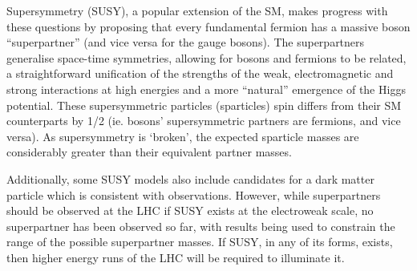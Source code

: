 Supersymmetry (SUSY), a popular extension of the SM, makes progress with these questions by proposing that every fundamental fermion has a massive boson “superpartner” (and vice versa for the gauge bosons). 
The superpartners generalise space-time symmetries, allowing for bosons and fermions to be related, a straightforward unification of the strengths of the weak, electromagnetic and strong interactions at high energies and a more “natural” emergence of the Higgs potential. 
These supersymmetric particles (sparticles) spin differs from their SM counterparts by 1/2 (ie. bosons’ supersymmetric partners are fermions, and vice versa). 
As supersymmetry is ‘broken’, the expected sparticle masses are considerably greater than their equivalent partner masses. 

Additionally, some SUSY models also include candidates for a dark matter particle which is consistent with observations. 
However, while superpartners should be observed at the LHC if SUSY exists at the electroweak scale, no superpartner has been observed so far, with results being used to constrain the range of the possible superpartner masses. 
If SUSY, in any of its forms, exists, then higher energy runs of the LHC will be required to illuminate it. 


